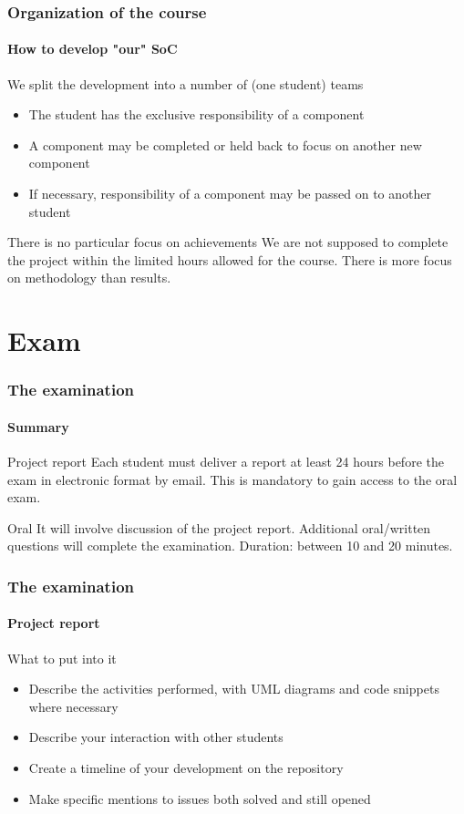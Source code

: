 \begin{frame}
\frametitle{Organization of the course}
\framesubtitle{How to develop "our" SoC}
\begin{block}{We split the development into a number of (one student) teams}
\begin{itemize}
\item The student has the exclusive responsibility of a component
\item A component may be completed or held back to focus on another new component
\item If necessary, responsibility of a component may be passed on to another student
\end{itemize}
\end{block}
\pause
\begin{block}{There is no particular focus on achievements}
We are not supposed to complete the project within the limited hours allowed for the course. There is more
focus on methodology than results.
\end{block}

\end{frame}

\section{Exam}

\begin{frame}
\frametitle{The examination}
\framesubtitle{Summary}
\begin{block}{Project report}
Each student must deliver a report at least 24 hours before the exam in electronic format by email. This is mandatory to gain access to the oral exam.
\end{block}

\begin{block}{Oral}
It will involve discussion of the project report. Additional
oral/written questions will complete the examination. Duration: between 10 and 20 minutes.
\end{block}

\end{frame}

\begin{frame}
\frametitle{The examination}
\framesubtitle{Project report}

\begin{block}{What to put into it}
\begin{itemize}
\item Describe the activities performed, with UML diagrams and code snippets where necessary
\item Describe your interaction with other students
\item Create a timeline of your development on the repository
\item Make specific mentions to issues both solved and still opened
\end{itemize}
\end{block}

\end{frame}

